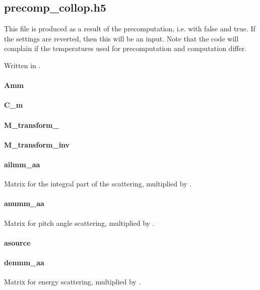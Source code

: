 \subsection{precomp\_collop.h5}
This file is produced as a result of the precomputation, i.e. with
 false and
 true. If the settings are
reverted, then this will be an input.
Note that the code will complain if the temperatures used for
precomputation and computation differ.

Written in .

\paragraph{Amm}

\paragraph{C\_m}

\paragraph{M\_transform\_}

\paragraph{M\_transform\_inv}

\paragraph{ailmm\_aa}
Matrix for the integral part of the scattering, multiplied by
.

\paragraph{anumm\_aa}
Matrix for pitch angle scattering, multiplied by .

\paragraph{asource}

\paragraph{denmm\_aa}
Matrix for energy scattering, multiplied by .


